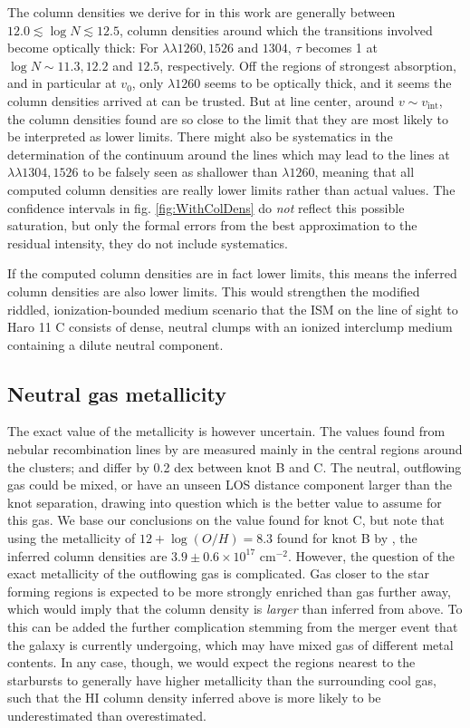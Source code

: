 \documentclass[twocolumn, trackchanges]{aastex61}
\begin{document}
The column densities we derive for  in this work are
generally between $12.0 \lesssim \log N \lesssim 12.5$, column densities
around which the transitions involved become optically thick: For
$\lambda \lambda 1260, 1526 \text{ and } 1304$, $\tau$ becomes 1 at
$\log N \sim 11.3, 12.2$ and $12.5$, respectively. Off the regions of
strongest absorption, and in particular at $v_0$, only $\lambda 1260$
seems to be optically thick, and it seems the column densities arrived
at can be trusted. But at line center, around $v\sim v_{\mathrm{int}}$, the
column densities found are so close to the limit that they are most
likely to be interpreted as lower limits. There might also be
systematics in the determination of the continuum around the lines which
may lead to the lines at $\lambda \lambda 1304, 1526$ to be falsely seen
as shallower than $\lambda 1260$, meaning that all computed column
densities are really lower limits rather than actual values. The
confidence intervals in fig. \ref{fig:WithColDens} do \emph{not} reflect
this possible saturation, but only the formal errors from the best
approximation to the residual intensity, they do not include
systematics.

If the computed column densities are in fact lower limits, this means
the inferred  column densities are also lower limits. This
would strengthen the modified riddled, ionization-bounded medium
scenario that the ISM on the line of sight to Haro 11 C consists of
dense, neutral clumps with an ionized interclump medium containing a
dilute neutral component.

\subsection{Neutral gas metallicity}\label{neutral-gas-metallicity}

The exact value of the metallicity is however uncertain. The values
found from nebular recombination lines by \citet{Guseva2012} are
measured mainly in the central  regions around the clusters;
and differ by 0.2 dex between knot B and C. The neutral, outflowing gas
could be mixed, or have an unseen LOS distance component larger than the
knot separation, drawing into question which is the better value to
assume for this gas. We base our conclusions on the value found for knot
C, but note that using the metallicity of $12 + \log (O/H) = 8.3$ found
for knot B by \citet{Guseva2012}, the inferred  column
densities are $3.9 \pm 0.6 \times 10^{17}$ cm$^{-2}$.
However, the question of the exact metallicity of the outflowing gas is
complicated. Gas closer to the star forming regions is expected to be
more strongly enriched than gas further away, which would imply that the
 column density is \emph{larger} than inferred from
 above. To this can be added the further complication
stemming from the merger event that the galaxy is currently undergoing,
which may have mixed gas of different metal contents. In any case,
though, we would expect the regions nearest to the starbursts to
generally have higher metallicity than the surrounding cool gas, such
that the HI column density inferred above is more likely to be
underestimated than overestimated.
\end{document}
